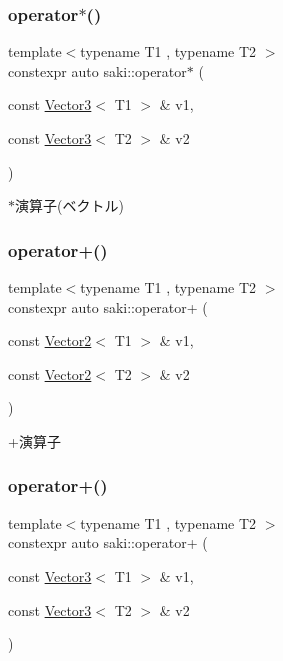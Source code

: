\subsubsection{\texorpdfstring{operator$\ast$()}{operator*()}\hspace{0.1cm}{\footnotesize\ttfamily [4/4]}}
{\footnotesize\ttfamily template$<$typename T1 , typename T2 $>$ \\
constexpr auto saki\+::operator$\ast$ (\begin{DoxyParamCaption}\item[{const \mbox{\hyperlink{classsaki_1_1_vector3}{Vector3}}$<$ T1 $>$ \&}]{v1,  }\item[{const \mbox{\hyperlink{classsaki_1_1_vector3}{Vector3}}$<$ T2 $>$ \&}]{v2 }\end{DoxyParamCaption})}



$\ast$演算子(ベクトル) 

\mbox{\label{namespacesaki_afa72a33da6ac050bfd8e91b9eae1422a}} 
\subsubsection{\texorpdfstring{operator+()}{operator+()}\hspace{0.1cm}{\footnotesize\ttfamily [1/2]}}
{\footnotesize\ttfamily template$<$typename T1 , typename T2 $>$ \\
constexpr auto saki\+::operator+ (\begin{DoxyParamCaption}\item[{const \mbox{\hyperlink{classsaki_1_1_vector2}{Vector2}}$<$ T1 $>$ \&}]{v1,  }\item[{const \mbox{\hyperlink{classsaki_1_1_vector2}{Vector2}}$<$ T2 $>$ \&}]{v2 }\end{DoxyParamCaption})}



+演算子 

\mbox{\label{namespacesaki_a482be906f8ccfd7fa303391e28e44f05}} 
\subsubsection{\texorpdfstring{operator+()}{operator+()}\hspace{0.1cm}{\footnotesize\ttfamily [2/2]}}
{\footnotesize\ttfamily template$<$typename T1 , typename T2 $>$ \\
constexpr auto saki\+::operator+ (\begin{DoxyParamCaption}\item[{const \mbox{\hyperlink{classsaki_1_1_vector3}{Vector3}}$<$ T1 $>$ \&}]{v1,  }\item[{const \mbox{\hyperlink{classsaki_1_1_vector3}{Vector3}}$<$ T2 $>$ \&}]{v2 }\end{DoxyParamCaption})}



